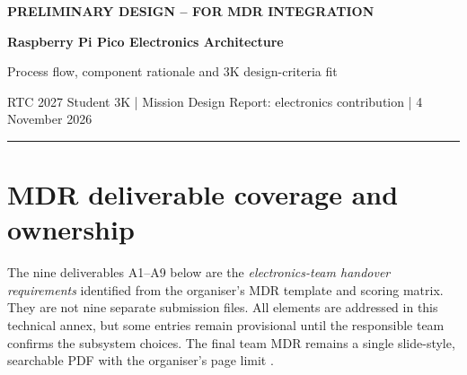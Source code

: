 \begin{center}
{\small\bfseries\color{Teal}PRELIMINARY DESIGN -- FOR MDR INTEGRATION}\par\vspace{3pt}
{\LARGE\bfseries\color{Navy}Raspberry Pi Pico Electronics Architecture}\par\vspace{2pt}
{\large Process flow, component rationale and 3K design-criteria fit}\par\vspace{4pt}
{\small RTC 2027 Student 3K | Mission Design Report: electronics contribution | 4 November 2026}\par
\end{center}
\vspace{-1mm}\hrule\vspace{3mm}



\section{MDR deliverable coverage and ownership}
\label{sec:mdrcoverage}
The nine deliverables A1--A9 below are the \emph{electronics-team handover requirements} identified from the organiser's MDR template and scoring matrix. They are not nine separate submission files. All elements are addressed in this technical annex, but some entries remain provisional until the responsible team confirms the subsystem choices. The final team MDR remains a single slide-style, searchable PDF with the organiser's page limit \cite{rtc2027app01,rtc2027app07}.

